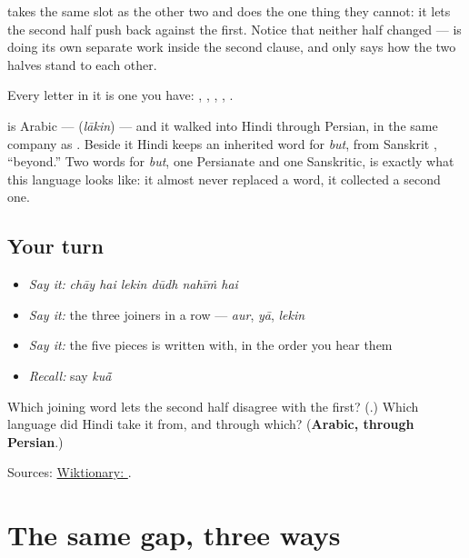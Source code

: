 \textbf{} takes the same slot as the other two and does the one thing they cannot: it lets the second half push back against the first. Notice that neither half changed — \textbf{} is doing its own separate work inside the second clause, and \textbf{} only says how the two halves stand to each other.

Every letter in it is one you have: \textbf{}, \textbf{}, \textbf{}, \textbf{}, \textbf{}.

\textbf{} is Arabic — \textbf{} (\emph{lākin}) — and it walked into Hindi through Persian, in the same company as \textbf{}. Beside it Hindi keeps an inherited word for \emph{but}, from Sanskrit \textbf{}, \textquotedblleft{}beyond.\textquotedblright{} Two words for \emph{but}, one Persianate and one Sanskritic, is exactly what this language looks like: it almost never replaced a word, it collected a second one.

\subsection*{Your turn}
\begin{itemize}
\raggedright
  \item \emph{Say it:} \emph{chāy hai lekin dūdh nahīṁ hai}
  \item \emph{Say it:} the three joiners in a row — \emph{aur}, \emph{yā}, \emph{lekin}
  \item \emph{Say it:} the five pieces \textbf{} is written with, in the order you hear them
  \item \emph{Recall:} say \emph{kuā̃}
\end{itemize}

\begin{tcolorbox}[breakable,colback=teal!4,colframe=teal!35!black,title={Before you move on}]
Which joining word lets the second half disagree with the first? (\textbf{}.) Which language did Hindi take it from, and through which? (\textbf{Arabic, through Persian}.)

Sources: \href{https://en.wiktionary.org/wiki/\%E0\%A4\%B2\%E0\%A5\%87\%E0\%A4\%95\%E0\%A4\%BF\%E0\%A4\%A8}{Wiktionary: }.
\end{tcolorbox}
\section[\texorpdfstring{… \hi{और} … · … \hi{या} … … (… aur … · … yā … …)}{… और … · … या … … (… aur … · … yā … …)}]{The same gap, three ways}

